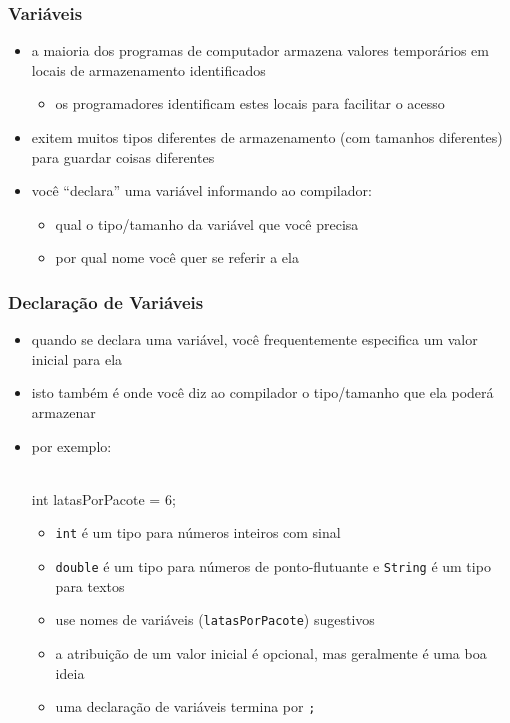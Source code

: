 \documentclass[xcolor={dvipsnames,table},aspectratio=169]{beamer}
\begin{document}
\begin{frame}\frametitle{Variáveis}
\begin{itemize}
	\item a maioria dos programas de computador armazena valores temporários em locais de armazenamento identificados
	\begin{itemize}
		\item os programadores identificam estes locais para facilitar o acesso
	\end{itemize}
	\item exitem muitos tipos diferentes de armazenamento (com tamanhos diferentes) para guardar coisas diferentes
	\item você ``declara'' uma variável informando ao compilador:
	\begin{itemize}
		\item qual o tipo/tamanho da variável que você precisa
		\item por qual nome você quer se referir a ela
	\end{itemize}
\end{itemize}
\end{frame}

\begin{frame}[fragile]\frametitle{Declaração de Variáveis}
\begin{itemize}
	\item quando se declara uma variável, você frequentemente especifica um valor inicial para ela
	\item isto também é onde você diz ao compilador o tipo/tamanho que ela poderá armazenar
	\item por exemplo:\\~\\
\begin{javacode}
int latasPorPacote = 6;
\end{javacode}
	\begin{itemize}
		\item \texttt{int} é um tipo para números inteiros com sinal
		\item \texttt{double} é um tipo para números de ponto-flutuante e \texttt{String} é um tipo para textos
		\item use nomes de variáveis (\texttt{latasPorPacote}) sugestivos
		\item a atribuição de um valor inicial é opcional, mas geralmente é uma boa ideia
		\item uma declaração de variáveis termina por \texttt{;}
	\end{itemize}
\end{itemize}
\end{frame}
\end{document}

